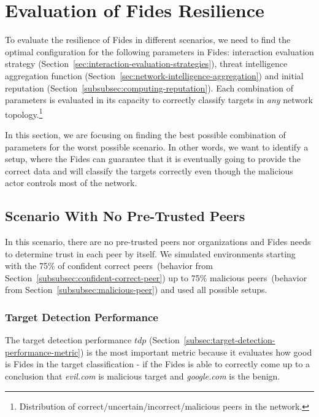 \section{Evaluation of Fides Resilience}
\label{sec:fides-resilience}

To evaluate the resilience of Fides in different scenarios, we need to find the optimal configuration for the following parameters in Fides: interaction evaluation strategy (Section~\ref{sec:interaction-evaluation-strategies}), threat intelligence aggregation function (Section~\ref{sec:network-intelligence-aggregation}) and initial reputation (Section~\ref{subsubsec:computing-reputation}). Each combination of parameters is evaluated in its capacity to correctly classify targets in \textit{any} network topology.\footnote{Distribution of correct/uncertain/incorrect/malicious peers in the network.}

In this section, we are focusing on finding the best possible combination of parameters for the worst possible scenario. In other words, we want to identify a setup, where the Fides can guarantee that it is eventually going to provide the correct data and will classify the targets correctly even though the malicious actor controls most of the network.

\subsection{Scenario With No Pre-Trusted Peers}
\label{subsec:scenario-with-0-pretrusted-peers}

In this scenario, there are no pre-trusted peers nor organizations and Fides needs to determine trust in each peer by itself.
We simulated environments starting with the 75\% of confident correct peers~(behavior from Section~\ref{subsubsec:confident-correct-peer}) up to 75\% malicious peers~(behavior from Section~\ref{subsubsec:malicious-peer}) and used all possible setups.

\cleartoleftpage %
\subsubsection{Target Detection Performance}

The target detection performance $tdp$ (Section~\ref{subsec:target-detection-performance-metric}) is the most important metric because it evaluates how good is Fides in the target classification - if the Fides is able to correctly come up to a conclusion that \textit{evil.com} is malicious target and \textit{google.com} is the benign.


